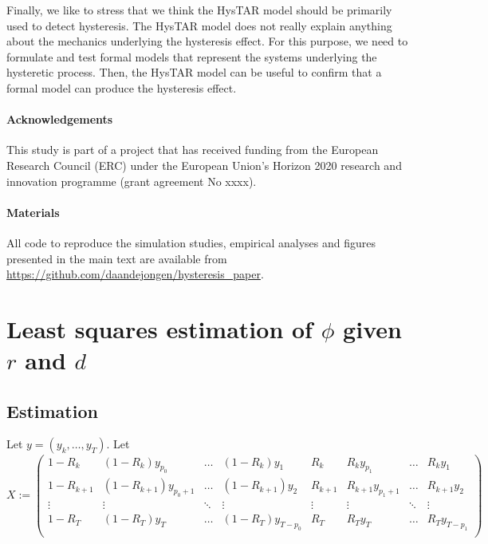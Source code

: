 \documentclass{article}
\begin{document}
Finally, we like to stress that we think the HysTAR model should be primarily used to detect hysteresis.
The HysTAR model does not really explain anything about the mechanics underlying the hysteresis effect.
For this purpose, we need to formulate and test formal models that represent the systems underlying the hysteretic process. Then, the HysTAR model can be useful to confirm that a formal model can produce the hysteresis effect.

\paragraph{Acknowledgements}
This study is part of a project that has received funding from the European Research Council (ERC) under the European Union's Horizon 2020 research and innovation programme (grant agreement No xxxx).
\paragraph{Materials} All code to reproduce the simulation studies, empirical analyses and figures presented in the main text are available from \url{https://github.com/daandejongen/hysteresis_paper}.




\appendix
 
\section{Least squares estimation of $\phi$ given $r$ and $d$}

\subsection{Estimation} \label{app:estimation}
Let $y = (y_k, \dots, y_T)$.
Let
$$X := \begin{pmatrix}
1 - R_k & (1 - R_k) y_{p_0} &  \dots & (1 - R_k) y_1 &
R_k & R_k y_{p_1} & \dots & R_k y_1 \\
1 - R_{k+1} & (1 - R_{k+1}) y_{p_0+1} & \dots & (1 - R_{k+1}) y_2 &
R_{k+1} & R_{k+1} y_{p_1+1} & \dots & R_{k+1} y_2 \\
\vdots & \vdots & \ddots & \vdots & 
\vdots & \vdots & \ddots & \vdots \\
1 - R_T & (1 - R_T) y_T & \dots & (1 - R_T) y_{T-p_0} &
R_T & R_T y_T & \dots & R_T y_{T-p_1} \\
\end{pmatrix}$$
\end{document}
